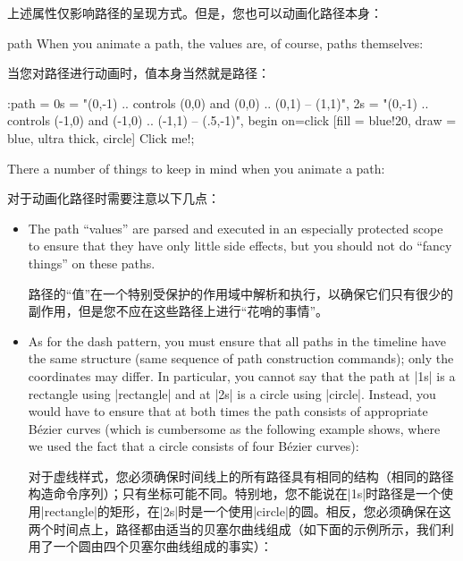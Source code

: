 上述属性仅影响路径的呈现方式。但是，您也可以动画化路径本身：

\begin{tikzanimateattribute}{path}
    When you animate a path, the values are, of course, paths themselves:


    当您对路径进行动画时，值本身当然就是路径：

\begin{codeexample}[
    preamble={\usetikzlibrary{animations}},
    animation list={0.5,1,1.5,2},
]
\tikz \node :path = {
        0s = "{(0,-1) .. controls (0,0) and (0,0)   .. (0,1) -- (1,1)}",
        2s = "{(0,-1) .. controls (-1,0) and (-1,0) .. (-1,1) -- (.5,-1)}",
        begin on=click }
  [fill = blue!20, draw = blue, ultra thick, circle] {Click me!};
\end{codeexample}
    There a number of things to keep in mind when you animate a path:
    
    对于动画化路径时需要注意以下几点：


    \begin{itemize}
        \item The path ``values'' are parsed and executed in an especially
            protected scope to ensure that they have only little side effects,
            but you should not do ``fancy things'' on these paths.

            路径的“值”在一个特别受保护的作用域中解析和执行，以确保它们只有很少的副作用，但是您不应在这些路径上进行“花哨的事情”。


        \item As for the dash pattern, you must ensure that all paths in the
            timeline have the same structure (same sequence of path
            construction commands); only the coordinates may differ. In
            particular, you cannot say that the path at |1s| is a rectangle
            using |rectangle| and at |2s| is a circle using |circle|. Instead,
            you would have to ensure that at both times the path consists of
            appropriate Bézier curves (which is cumbersome as the following
            example shows, where we used the fact that a circle consists of
            four Bézier curves):
            
            对于虚线样式，您必须确保时间线上的所有路径具有相同的结构（相同的路径构造命令序列）；只有坐标可能不同。特别地，您不能说在|1s|时路径是一个使用|rectangle|的矩形，在|2s|时是一个使用|circle|的圆。相反，您必须确保在这两个时间点上，路径都由适当的贝塞尔曲线组成（如下面的示例所示，我们利用了一个圆由四个贝塞尔曲线组成的事实）：



\end{itemize}
\end{tikzanimateattribute}
